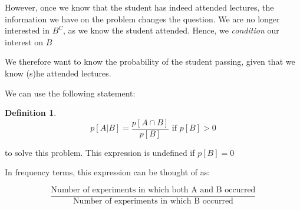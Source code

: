 \documentclass[12pt]{extbook}
\newtheorem{df}{Definition}[section]
\begin{document}
However, once we know that the student has indeed attended lectures, the information we have on the problem changes the question.   We are no longer interested in $B^C$, as we know the student attended.   Hence, we {\color{green}\emph{condition}} our interest on $B$


We therefore want to know the probability of the student passing, given that we know (s)he attended lectures.



We can use the following statement:

\begin{df}
\begin{displaymath}
p[A|B] = \frac{p[A \cap B] }{p[B]} \mbox{ if } p[B] > 0
\end{displaymath}
\end{df}
to solve this problem.   This expression is undefined if $p[B] = 0$

 

In frequency terms, this expression can be thought of as:

\begin{displaymath}
\frac{\mbox{Number of experiments in which both A and B occurred}}{\mbox{Number of experiments in which B occurred}}
\end{displaymath}



 


 




\end{document}
